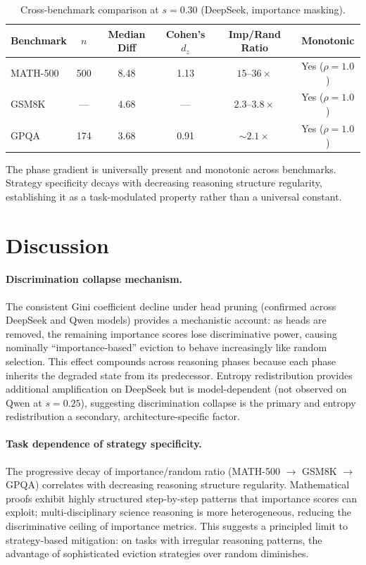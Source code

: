 \documentclass[11pt]{article}
\begin{document}
\begin{table}[t]
\centering
\caption{Cross-benchmark comparison at $s=0.30$ (DeepSeek, importance masking).}
\label{tab:cross_benchmark}
\begin{tabular}{lccccc}
\toprule
Benchmark & $n$ & Median Diff & Cohen's $d_z$ & Imp/Rand Ratio & Monotonic \\
\midrule
MATH-500 & 500 & 8.48 & 1.13 & $15$--$36\times$ & Yes ($\rho=1.0$) \\
GSM8K & --- & 4.68 & --- & $2.3$--$3.8\times$ & Yes ($\rho=1.0$) \\
GPQA & 174 & 3.68 & 0.91 & $\sim 2.1\times$ & Yes ($\rho=1.0$) \\
\bottomrule
\end{tabular}
\end{table}

The phase gradient is universally present and monotonic across benchmarks. Strategy specificity decays with decreasing reasoning structure regularity, establishing it as a task-modulated property rather than a universal constant.

\section{Discussion}

\paragraph{Discrimination collapse mechanism.} The consistent Gini coefficient decline under head pruning (confirmed across DeepSeek and Qwen models) provides a mechanistic account: as heads are removed, the remaining importance scores lose discriminative power, causing nominally ``importance-based'' eviction to behave increasingly like random selection. This effect compounds across reasoning phases because each phase inherits the degraded state from its predecessor. Entropy redistribution provides additional amplification on DeepSeek but is model-dependent (not observed on Qwen at $s=0.25$), suggesting discrimination collapse is the primary and entropy redistribution a secondary, architecture-specific factor.

\paragraph{Task dependence of strategy specificity.} The progressive decay of importance/random ratio (MATH-500 $\rightarrow$ GSM8K $\rightarrow$ GPQA) correlates with decreasing reasoning structure regularity. Mathematical proofs exhibit highly structured step-by-step patterns that importance scores can exploit; multi-disciplinary science reasoning is more heterogeneous, reducing the discriminative ceiling of importance metrics. This suggests a principled limit to strategy-based mitigation: on tasks with irregular reasoning patterns, the advantage of sophisticated eviction strategies over random diminishes.
\end{document}
